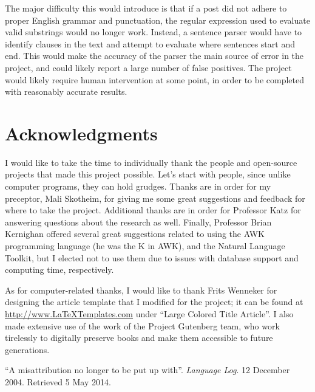 \documentclass[DIV=calc, paper=letter, fontsize=12pt]{scrartcl}	 %
\begin{document}
\begin{multicols}{2}
The major difficulty this would introduce is that if a post did not adhere to proper English grammar and
punctuation, the regular expression used to evaluate valid substrings would no longer work. Instead,
a sentence parser would have to identify clauses in the text and attempt to evaluate where sentences
start and end. This would make the accuracy of the parser the main source of error in the project,
and could likely report a large number of false positives. The project would likely require human 
intervention at some point, in order to be completed with reasonably accurate results.


\section{Acknowledgments}

I would like to take the time to individually thank the people and open-source projects that made this 
project possible. Let's start with people, since unlike computer programs, they can hold grudges. 
Thanks are in order for my preceptor, Mali Skotheim, for giving me some great suggestions and 
feedback for where to take the project. Additional thanks are in order for Professor Katz for answering
questions about the research as well. Finally, Professor Brian Kernighan offered several great suggestions
related to using the AWK programming language (he was the K in AWK), and the Natural Language Toolkit,
but I elected not to use them due to issues with database support and computing time, respectively. 

As for computer-related thanks, I would like to thank Frits Wenneker for designing the article
template that I modified for the project; it can be found at \url{http://www.LaTeXTemplates.com} under
``Large Colored Title Article''. I also made extensive use of the work of the Project Gutenberg team,
who work tirelessly to digitally preserve books and make them accessible to future generations.



\begin{thebibliography}{99} %

  ``A misattribution no longer to be put up with''. \emph{Language Log}. 12 December 2004. Retrieved 5 May 2014.
 

\end{thebibliography}
\end{multicols}
\end{document}
